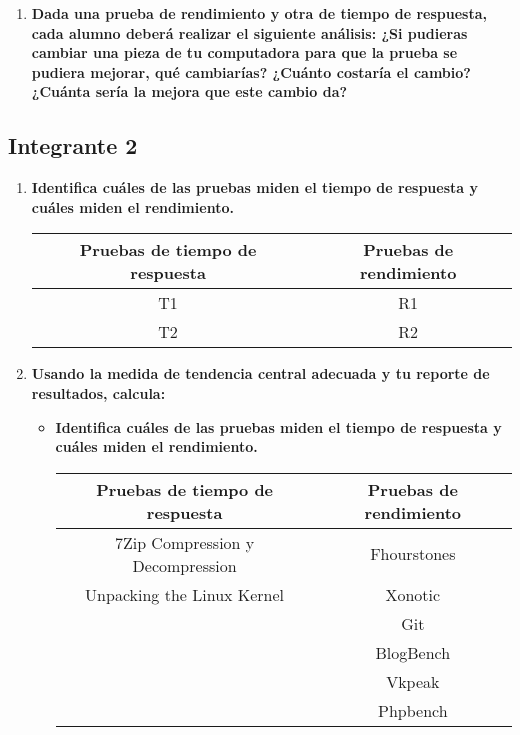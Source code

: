 \documentclass[12pt]{article}
\newcommand{\pl}[1]{\item \textbf{ #1 }}
\begin{document}
\begin{enumerate}[(3.1.1)]
    \pl{Dada una prueba de rendimiento y otra de tiempo de respuesta, cada alumno deberá realizar el siguiente análisis: ¿Si pudieras cambiar una pieza de tu computadora para que la prueba se pudiera mejorar, qué cambiarías? ¿Cuánto costaría el cambio? ¿Cuánta sería la mejora que este cambio da?}

\end{enumerate}

\subsection{Integrante 2}

\begin{enumerate}[(3.2.1)]
    \pl{Identifica cuáles de las pruebas miden el tiempo de respuesta y cuáles miden el rendimiento.}
    \begin{table}[htb]
        \centering
        \begin{tabular}{|c|c|}
        \hline
        Pruebas de tiempo de respuesta & Pruebas de rendimiento \\
        \hline
        T1 & R1 \\
        \hline
        T2 & R2 \\
        \hline
        \end{tabular}
    \end{table}\par

    \pl{Usando la medida de tendencia central adecuada y tu reporte de resultados, calcula:}
    \begin{itemize}
        \pl{Identifica cuáles de las pruebas miden el tiempo de respuesta y cuáles miden el rendimiento.}
    \begin{table}[htb]
        \centering
        \begin{tabular}{|c|c|}
        \hline
        Pruebas de tiempo de respuesta & Pruebas de rendimiento \\
        \hline
        7Zip Compression y Decompression & Fhourstones \\
        \hline
        Unpacking the Linux Kernel & Xonotic \\
        \hline
         & Git \\
        \hline
        & BlogBench \\
        \hline
        & Vkpeak \\
        \hline
        & Phpbench \\
        \hline
        \end{tabular}
    \end{table}\par


\end{itemize}
\end{enumerate}
\end{document}
